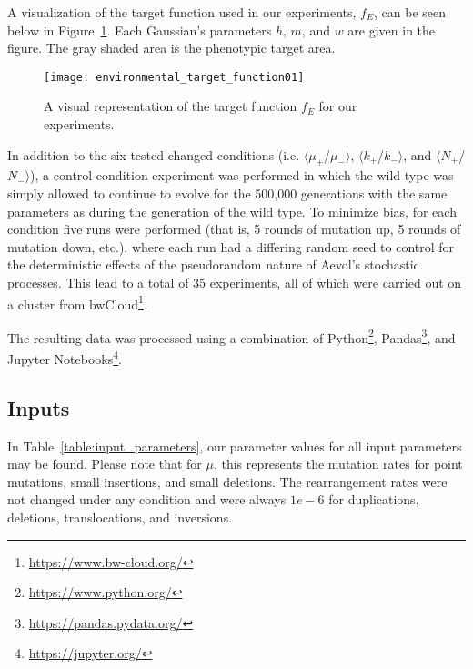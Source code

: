 A visualization of the target function used in our experiments, $f_E$, can be seen below in Figure~\ref{fig:target_function}. Each Gaussian's parameters $h$, $m$, and $w$ are given in the figure. The gray shaded area is the phenotypic target area.  

\begin{figure}[H]
	\centering
	\texttt{[image: environmental\_target\_function01]}
	\caption[Experimental target function]{A visual representation of the target function $f_E$ for our experiments.}
	\label{fig:target_function}
\end{figure}

 
In addition to the six tested changed conditions (i.e. $\langle\mu_+$/$\mu_-\rangle$, $\langle k_+$/$k_-\rangle$, and $\langle N_+$/$N_-\rangle$), a control condition experiment was performed in which the wild type was simply allowed to continue to evolve for the 500,000 generations with the same parameters as during the generation of the wild type. To minimize bias, for each condition five runs were performed (that is, 5 rounds of mutation up, 5 rounds of mutation down, etc.), where each run had a differing random seed to control for the deterministic effects of the pseudorandom nature of Aevol's stochastic processes. This lead to a total of 35 experiments, all of which were carried out on a cluster from bwCloud\footnote{\url{https://www.bw-cloud.org/}}. 

The resulting data was processed using a combination of Python\footnote{\url{https://www.python.org/}}, Pandas\footnote{\url{https://pandas.pydata.org/}}, and Jupyter Notebooks\footnote{\url{https://jupyter.org/}}.  

\subsection{Inputs}
In Table~\ref{table:input_parameters}, our parameter values for all input parameters may be found. Please note that for $\mu$, this represents the mutation rates for point mutations, small insertions, and small deletions. The rearrangement rates were not changed under any condition and were always $1e-6$ for duplications, deletions, translocations, and inversions. 

